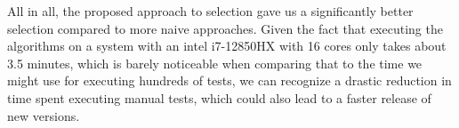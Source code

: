 All in all, the proposed approach to selection gave us a significantly better selection compared to more naive approaches. Given the fact that executing the algorithms on a system with an intel i7-12850HX with 16 cores only takes about 3.5 minutes, which is barely noticeable when comparing that to the time we might use for executing hundreds of tests, we can recognize a drastic reduction in time spent executing manual tests, which could also lead to a faster release of new versions.


